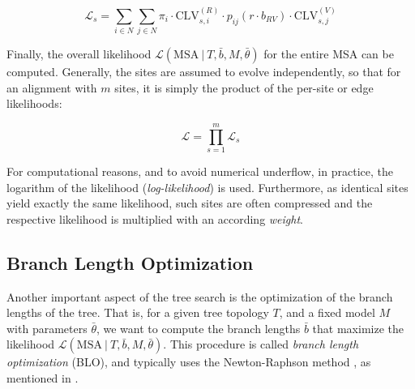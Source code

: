 \begin{equation}
    \label{ch:Foundations:sec:MLTreeInference:eq:edge_likelihood}
    \mathcal{L}_{s} = \sum_{i \in N} \sum_{j \in N} \pi_i \cdot \mbox{CLV}^{(R)}_{s,i} \cdot
    p_{ij}(r \cdot b_{RV}) \cdot \mbox{CLV}^{(V)}_{s,j}
\end{equation}

Finally, the overall likelihood $\mathcal{L}( \mbox{MSA} ~|~ T, \bar{b}, M, \bar{\theta} )$
for the entire MSA can be computed.
Generally, the sites are assumed to evolve independently,
so that for an alignment with $m$ sites, it is simply the product of the per-site or edge likelihoods:

\begin{equation}
    \label{ch:Foundations:sec:MLTreeInference:eq:root_likelihood}
    \mathcal{L} = \prod_{s=1}^{m} \mathcal{L}_s
\end{equation}

For computational reasons, and to avoid numerical underflow, in practice,
the logarithm of the likelihood (\emph{log-likelihood}) is used.
Furthermore, as identical sites yield exactly the same likelihood,
such sites are often compressed and the respective likelihood is multiplied with an according \emph{weight}.


\subsection{Branch Length Optimization}
\label{ch:Foundations:sec:MLTreeInference:sub:BLO}

Another important aspect of the tree search
is the optimization of the branch lengths of the tree.
That is, for a given tree topology $T$, and a fixed model $M$ with parameters $\bar{\theta}$,
we want to compute the branch lengths $\bar{b}$
that maximize the likelihood $\mathcal{L}( \mbox{MSA} ~|~ T, \bar{b}, M, \bar{\theta} )$.
This procedure is called \emph{branch length optimization} (BLO),
and typically uses the Newton-Raphson method \cite{Ypma1995},
as mentioned in .


